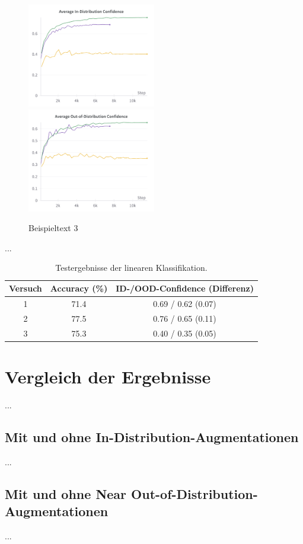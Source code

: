 \begin{figure}
	\centering
	\includegraphics[width=0.5\textwidth]{figure_results_supcon-lin_avg-id-conf.png}%
	\includegraphics[width=0.5\textwidth]{figure_results_supcon-lin_avg-ood-conf.png}
	\caption{Beispieltext 3}
	\label{fig:supcon-lin-ood-detection}
\end{figure}

...

\begin{table}
	\caption{Testergebnisse der linearen Klassifikation.}
	\begin{tabular}{|c|c|c|}
		\hline
		\textbf{Versuch} & \textbf{Accuracy (\%)} & \textbf{ID-/OOD-Confidence (Differenz)} \\
		\hline
		1 & 71.4 & 0.69 / 0.62 (0.07) \\
		2 & 77.5 & 0.76 / 0.65 (0.11) \\
		3 & 75.3 & 0.40 / 0.35 (0.05) \\
		\hline
	\end{tabular}
	\label{tab:supcon-lin-results}
\end{table}

\section{Vergleich der Ergebnisse} \label{sec:results-comparison}

...

\subsection{Mit und ohne In-Distribution-Augmentationen} \label{sec:results-comparison-id}

...

\subsection{Mit und ohne Near Out-of-Distribution-Augmentationen} \label{sec:results-comparison-ood}

...

